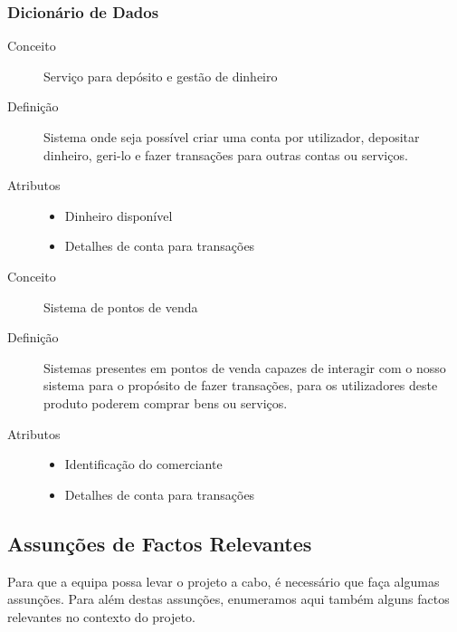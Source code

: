 \documentclass[12pt,a4paper]{article}
\begin{document}
    \subsubsection{Dicionário de Dados}

      \begin{description}
        \item[Conceito]Serviço para depósito e gestão de dinheiro
        \item[Definição]Sistema onde seja possível criar uma conta por utilizador, depositar dinheiro, geri-lo e fazer transações para outras contas ou serviços.

        \item[Atributos] \hfill
          \begin{itemize}
            \item Dinheiro disponível
            \item Detalhes de conta para transações
          \end{itemize}
      \end{description}
      
      \vspace{0.5cm}
      
      \begin{description}
        \item[Conceito]Sistema de pontos de venda
        \item[Definição]Sistemas presentes em pontos de venda capazes de interagir com o nosso sistema para o propósito de fazer transações, para os utilizadores deste produto poderem comprar bens ou serviços.

        \item[Atributos]\hfill
          \begin{itemize}
            \item Identificação do comerciante
            \item Detalhes de conta para transações
          \end{itemize}
      \end{description}

  \subsection{Assunções de Factos Relevantes}
    Para que a equipa possa levar o projeto a cabo, é necessário que faça algumas assunções. Para além destas assunções, enumeramos aqui também alguns factos relevantes no contexto do projeto.
\end{document}

